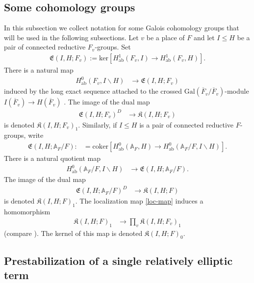 \documentclass[12pt]{amsart}
\theoremstyle{remark}
\numberwithin{equation}{section}
\newcommand{\A}{\mathbb{A}}
\newcommand{\Gal}{\mathrm{Gal}}
\newcommand{\lto}{\longrightarrow}
\theoremstyle{definition}
\renewcommand{\bar}{\overline}
\numberwithin{equation}{subsection}
\begin{document}
\subsection{Some cohomology groups}
\label{ssec-ch-groups}
In this subsection we collect notation for some Galois cohomology groups that will be used in the following subsections.
Let $v$ be a place of $F$ and let $I \leq H$ be a pair of connected reductive $F_v$-groups. Set
\begin{align} \label{elocdef}
\mathfrak{E}(I,H;F_v):=
\mathrm{ker}\left[H^1_{\mathrm{ab}}(F_v,I)
\to H^1_{\mathrm{ab}}(F_v,H)\right].
\end{align}There is a natural map
\begin{align*}
H^0_{\mathrm{ab}}(F_v,I \backslash H)
 &\lto \mathfrak{E}(I,H;F_v)
\end{align*}
induced by the long exact sequence attached to the crossed $\Gal(\bar{F}_v/\bar{F}_v)$-module $I(\bar{F}_v) \to H(\bar{F}_v)$ \cite[p.~20]{Lab}.
The image of the dual map
\begin{align*}
\mathfrak{E}(I,H;F_v)^D
&\lto \mathfrak{K}(I,H;F_v)
\end{align*}
is denoted $\mathfrak{K}(I,H;F_v)_1$. 
Similarly, if $I \leq H$ is a pair of connected reductive $F$-groups, write
\begin{align*}
\mathfrak{E}(I,H;\A_F/F):&=
\mathrm{coker}\left[ H^0_{\mathrm{ab}}(\A_F,H) \to
H^0_{\mathrm{ab}}(\A_F/F,I\backslash H)\right].
\end{align*}\index{$\mathfrak{E}(I,H;\A_F/F)$}There is a natural quotient map
\begin{align*}
H^0_{\mathrm{ab}}(\A_F/F,I \backslash H)
 &\lto \mathfrak{E}(I, H;\A_F/F).
\end{align*}
The image of the dual map
\begin{align*}
\mathfrak{E}(I, H;\A_F/F)^D
&\lto \mathfrak{K}(I,H;F)
\end{align*}
is denoted $\mathfrak{K}(I,H;F)_1$. 
  The localization map \eqref{loc-map} induces a homomorphism
\begin{align} \label{loc-map-1}
\mathfrak{K}(I,H;F)_1
&\lto \prod_v \mathfrak{K}(I,H;F_v)_1
\end{align}
(compare \cite[p. 43]{Lab}).  The kernel of this map is denoted
$\mathfrak{K}(I,H;F)_0$. 



\subsection{Prestabilization of a single relatively elliptic term}
\end{document}
